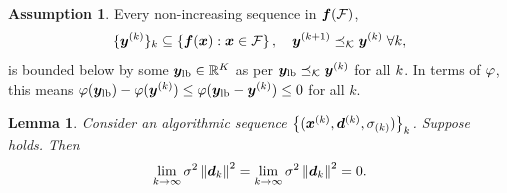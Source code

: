 \documentclass{article}
\theoremstyle{plain}
\newtheorem{lemma}[theorem]{Lemma}
\theoremstyle{definition}
\newtheorem{assumption}{Assumption}
\begin{document}
\begin{assumption}\label{ass:monotonic_seq_bounded}
	Every non-increasing sequence in $\bm{f}(\mathcal F)$,
	$$
	\{\bm{y}^{(k)}\}_{k} \subseteq \left\{\bm{f}(\bm{x}): \bm{x}\in \mathcal F\right\},
	\quad \bm{y}^{(k+1)} \preceq_\mathcal K \bm{y}^{(k)} \;\forall k,
	$$
	is bounded below by some $\bm{y}_{\mathrm{lb}}\in \mathbb R^K$ as per
	$
	\bm{y}_{\mathrm{lb}} \preceq_\mathcal K \bm{y}^{(k)}
	$ for all $k$.
	In terms of $\varphi$, this means 
	$
	\varphi(\bm{y}_{\mathrm{lb}})-\varphi(\bm{y}^{(k)})
	\leq 
	\varphi(\bm{y}_{\mathrm{lb}} - \bm{y}^{(k)})
	\leq 
	0
	$
	for all $k$.
\end{assumption}

\begin{lemma}%
	\label{thm:stepNorm_zero}
	Consider an algorithmic sequence $\left\{(\bm{x}^{(k)}, \bm{d}^{(k)}, \sigma_{(k)})\right\}_k$.
	Suppose~ holds. 
	Then 
	\begin{equation*}
		\lim_{k\to \infty} \sigma^2 \left\|\bm{d}_k\right\|^2
		=
		\lim_{k\to \infty} \sigma^2 \left\|\bm{d}_k\right\|^2
		= 
		0.
	\end{equation*}
\end{lemma}
\end{document}
